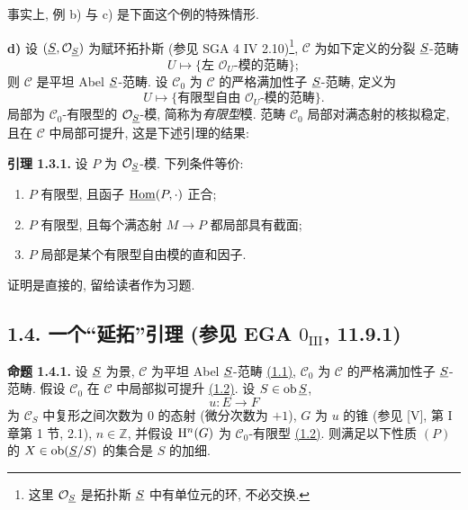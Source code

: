 事实上, 例 b) 与 c) 是下面这个例的特殊情形.

\textbf{d)} 设 \((\underline S,\mathcal O_{\underline S})\) 为赋环拓扑斯 (参见 SGA 4 IV 2.10)\footnote{这里 \(\mathcal O_{\underline S}\) 是拓扑斯 \(\underline S\) 中有单位元的环, 不必交换.}, \(\mathcal C\) 为如下定义的分裂 \(\underline S\)-范畴
\[
  U\longmapsto \{\text{左 }\mathcal O_U\text{-模的范畴}\};
\]
则 \(\mathcal C\) 是平坦 Abel \(\underline S\)-范畴. 设 \(\mathcal C_0\) 为 \(\mathcal C\) 的严格满加性子 \(\underline S\)-范畴, 定义为
\[
  U\longmapsto \{\text{有限型自由 }\mathcal O_U\text{-模的范畴}\}.
\]
局部为 \(\mathcal C_0\)-有限型的 \(\mathcal O_{\underline S}\)-模, 简称为\emph{有限型}模. 范畴 \(\mathcal C_0\) 局部对满态射的核拟稳定, 且在 \(\mathcal C\) 中局部可提升, 这是下述引理的结果:

\textbf{引理 1.3.1.} 设 \(P\) 为 \(\mathcal O_{\underline S}\)-模. 下列条件等价:
\begin{enumerate}[label=(\roman*)]
\item \(P\) 有限型, 且函子 \(\underline{\operatorname{Hom}}(P,\cdot)\) 正合;
\item \(P\) 有限型, 且每个满态射 \(M\to P\) 都局部具有截面;
\item \(P\) 局部是某个有限型自由模的直和因子.
\end{enumerate}
证明是直接的, 留给读者作为习题.

\subsection*{1.4. 一个“延拓”引理 (参见 EGA \(0_{\mathrm{III}}\), 11.9.1)}

\textbf{命题 1.4.1.} 设 \(\underline S\) 为景, \(\mathcal C\) 为平坦 Abel \(\underline S\)-范畴 \hyperlink{sga6.e01.sec.1.1}{(1.1)}, \(\mathcal C_0\) 为 \(\mathcal C\) 的严格满加性子 \(\underline S\)-范畴. 假设 \(\mathcal C_0\) 在 \(\mathcal C\) 中局部拟可提升 \hyperlink{sga6.e01.sec.1.2}{(1.2)}. 设 \(S\in\operatorname{ob}\underline S\),
\[
  u:E\longrightarrow F
\]
为 \(\mathcal C_S\) 中复形之间次数为 \(0\) 的态射 (微分次数为 \(+1\)), \(G\) 为 \(u\) 的锥 (参见 [V], 第 I 章第 1 节, 2.1), \(n\in\mathbb Z\), 并假设 \(\mathrm H^n(G)\) 为 \(\mathcal C_0\)-有限型 \hyperlink{sga6.e01.sec.1.2}{(1.2)}. 则满足以下性质 \((P)\) 的 \(X\in\operatorname{ob}(\underline S/S)\) 的集合是 \(S\) 的加细.

